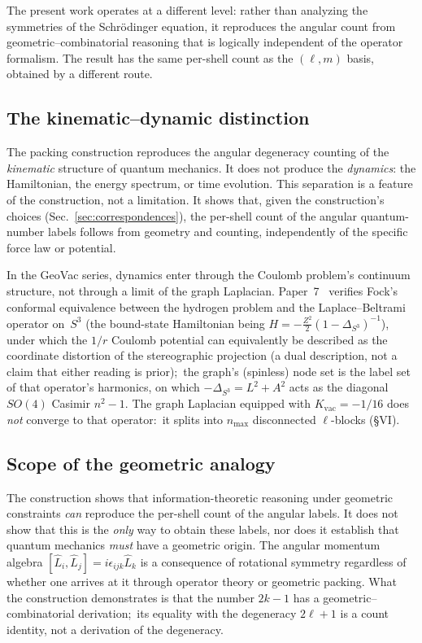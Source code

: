 \documentclass[aps,prl,reprint,amsmath,amssymb]{revtex4-2}
\newcommand{\gvc}[2]{#2}
\begin{document}
The present work operates at a different level: rather than analyzing
the symmetries of the Schr\"odinger equation, it reproduces the
angular count from geometric--combinatorial reasoning that is
logically independent of the operator formalism.  The result has the
same per-shell count as the $(\ell, m)$ basis, obtained by a different
route.

\subsection{The kinematic--dynamic distinction}

The packing construction reproduces the angular degeneracy
counting of the \emph{kinematic} structure of quantum
mechanics.  It does not produce the \emph{dynamics}:
the Hamiltonian, the energy spectrum, or time evolution.  This
separation is a feature of the construction, not a limitation.  It
shows that, given the construction's choices (Sec.~\ref{sec:correspondences}),
the per-shell count of the angular quantum-number labels follows from
geometry and counting,
independently of the specific force law or potential.

In the GeoVac series, \gvc{graph-s3-wall}{dynamics enter through the Coulomb problem's
continuum structure, not through a limit of the graph Laplacian}.
Paper~7~\cite{paper7} verifies Fock's conformal equivalence between the
hydrogen problem and the Laplace--Beltrami operator on~$S^3$ (the
bound-state Hamiltonian being $H = -\tfrac{Z^2}{2}(1-\Delta_{S^3})^{-1}$), under
which the $1/r$ Coulomb potential can equivalently be described as the
coordinate distortion of the stereographic projection (a dual
description, not a claim that either reading is prior);\ the
graph's (spinless) node set is the label set of that operator's
harmonics, on which $-\Delta_{S^3} = L^2 + A^2$ acts as the diagonal
$SO(4)$ Casimir $n^2 - 1$.  The graph
Laplacian equipped with $K_{\mathrm{vac}} = -1/16$ does \emph{not}
converge to that operator:\ it splits into $n_{\max}$ disconnected
$\ell$-blocks (\S VI).

\subsection{Scope of the geometric analogy}

The construction shows that information-theoretic reasoning under
geometric constraints \emph{can} reproduce the per-shell count of the
angular labels.  It does not show that this is the \emph{only} way to
obtain these labels, nor does it establish that quantum mechanics
\emph{must} have a geometric origin.  The angular momentum algebra
$[\hat{L}_i, \hat{L}_j] = i\epsilon_{ijk}\hat{L}_k$ is a consequence
of rotational symmetry regardless of whether one arrives at it through
operator theory or geometric packing.  What the construction
demonstrates is that the number $2k - 1$ has a geometric--combinatorial
derivation;\ its equality with the degeneracy $2\ell + 1$ is a count
identity, not a derivation of the degeneracy.
\end{document}
